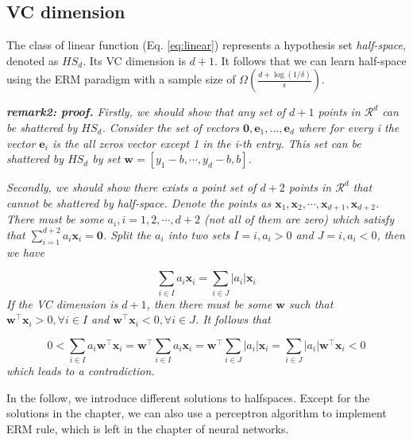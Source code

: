 \documentclass{article}
\begin{document}
	\subsection{VC dimension}
	The class of linear function (Eq. \ref{eq:linear}) represents a hypothesis set  \textit{half-space}, denoted as $HS_d$. Its VC dimension is $d+1$.  It follows that we can learn half-space using the ERM paradigm with a sample size of $\Omega(\frac{d+\log(1/\delta)}{\epsilon})$. 

	\begin{framed}
	\begin{scriptsize}
	\begin{spacing}{1.2}
	\noindent\textit{\textbf{remark2: proof.} Firstly, we should show that any set of $d+1$ points in $\mathcal{R}^d$ can be shattered by $HS_d$. Consider the set of vectors $\mathbf{0}, \mathbf{e}_1, ..., \mathbf{e}_d$ where for every i the vector $\mathbf{e}_i$ is the all zeros vector except 1 in the i-th entry. This set can be shattered by $HS_d$ by set $\mathbf{w}=[y_1-b,\cdots,y_d-b,b]$.}
	
	\textit{Secondly, we should show there exists a point set of $d+2$ points in $\mathcal{R}^{d}$ that cannot be shattered by half-space. Denote the points as $\mathbf{x}_1, \mathbf{x}_2, \cdots, \mathbf{x}_{d+1}, \mathbf{x}_{d+2}$. There must be some $a_i, i=1,2,\cdots,d+2$ (not all of them are zero) which satisfy that $\sum_{i=1}^{d+2} a_i \mathbf{x}_i = \mathbf{0}$. Split the $a_i$ into two sets $I={i,a_i>0}$ and $J={i,a_i<0}$, then we have }
	
	\begin{equation*}
	\sum_{i\in I} a_i \mathbf{x}_i = \sum_{i \in J} |a_i| \mathbf{x}_i
	\end{equation*}
	\textit{If the VC dimension is $d+1$, then there must be some $\mathbf{w}$ such that $\mathbf{w}^\top \mathbf{x}_i > 0, \forall i \in I$ and $\mathbf{w}^\top \mathbf{x}_i < 0, \forall i \in J$. It follows that}
	
	\begin{equation*}
	0 < \sum_{i \in I} a_i \mathbf{w}^\top \mathbf{x}_i = \mathbf{w}^\top  \sum_{i \in I} a_i \mathbf{x}_i = \mathbf{w}^\top  \sum_{i \in J} |a_i| \mathbf{x}_i =  \sum_{i \in J} |a_i| \mathbf{w}^\top \mathbf{x}_i  < 0
	\end{equation*}
	\noindent\textit{which leads to a contradiction.}
	\end{spacing}
	\end{scriptsize}
	\end{framed}
	 In the follow, we introduce different solutions to halfspaces. Except for the solutions in the chapter, we can also use a perceptron algorithm to implement ERM rule, which is left in the chapter of neural networks.
	 
\end{document}
